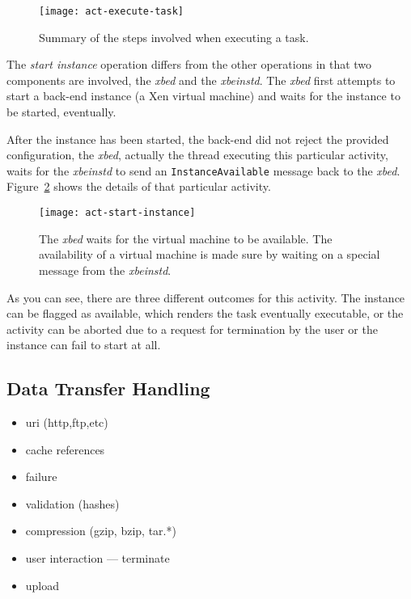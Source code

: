 \begin{figure}[ht]
  \centering
  \texttt{[image: act-execute-task]}
  \caption[Summary of executing a task]{Summary of the steps involved when executing a task.}
  \label{fig:act-execute-task}
\end{figure}

The \emph{start  instance} operation differs from the  other operations in
that two components are involved, the \emph{xbed} and the \emph{xbeinstd}.
The \emph{xbed}  first attempts  to start a  back-end instance (\eg  a Xen
virtual machine) and waits for the instance to be started, eventually.

After the instance  has been started, \ie the back-end  did not reject the
provided  configuration, the  \emph{xbed}, actually  the  thread executing
this  particular  activity,  waits  for  the \emph{xbeinstd}  to  send  an
\texttt{Instance\-Available}        message       back        to       the
\emph{xbed}. Figure~\ref{fig:act-start-instance} shows the details of that
particular activity.

\begin{figure}[ht]
  \centering
  \texttt{[image: act-start-instance]}
  \caption[Start Instance Activity]{The  \emph{xbed} waits for the virtual
    machine to  be available.   The availability of  a virtual  machine is
    made sure by waiting on a special message from the \emph{xbeinstd}.}
  \label{fig:act-start-instance}
\end{figure}


As you can see, there are  three different outcomes for this activity. The
instance can  be flagged as  available, which renders the  task eventually
executable,  or  the  activity  can  be  aborted  due  to  a  request  for
termination by the user or the instance can fail to start at all.


\subsection{Data Transfer Handling}
\label{sec:xbed:data-transfer}

\begin{itemize}
\item uri (http,ftp,etc)
\item cache references
\item failure
\item validation (hashes)
\item compression (gzip, bzip, tar.*)
\item user interaction --- terminate
\item upload
\end{itemize}

